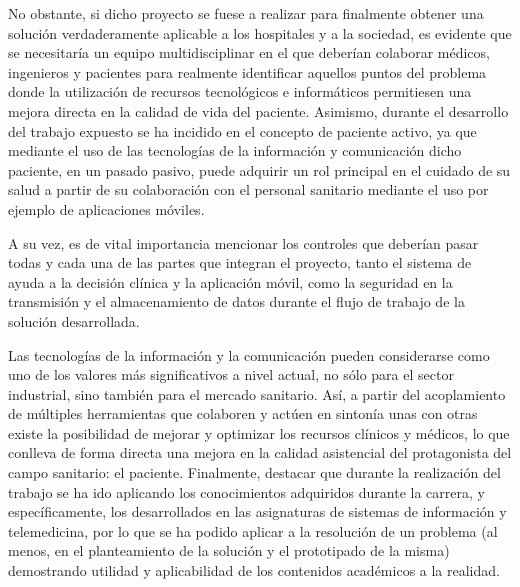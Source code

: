 \documentclass{article}
\begin{document}
No obstante, si dicho proyecto se fuese  a  realizar  para  finalmente
obtener una solución verdaderamente aplicable a los hospitales y a  la
sociedad, es evidente que se necesitaría un equipo multidisciplinar en
el  que  deberían  colaborar  médicos,	ingenieros  y  pacientes  para
realmente  identificar	aquellos  puntos   del	 problema   donde   la
utilización de recursos tecnológicos e	informáticos  permitiesen  una
mejora directa en la calidad de vida del paciente.  Asimismo,  durante
el desarrollo del trabajo expuesto se ha incidido en  el  concepto  de
paciente activo, ya que mediante el  uso  de  las  tecnologías	de  la
información y comunicación dicho paciente, en un pasado pasivo,  puede
adquirir un rol principal en el cuidado de su salud  a	partir	de  su
colaboración con el personal sanitario mediante el uso por ejemplo  de
aplicaciones móviles.

A su vez, es de vital importancia mencionar los controles que deberían
pasar todas y cada una de las partes que integran el  proyecto,  tanto
el sistema de ayuda a la decisión clínica y la aplicación móvil,  como
la seguridad en la transmisión y el almacenamiento de datos durante el
flujo de trabajo de la solución desarrollada.

Las  tecnologías  de  la  información	y   la	 comunicación	pueden
considerarse como uno  de  los	valores  más  significativos  a  nivel
actual, no sólo para  el  sector  industrial,  sino  también  para  el
mercado sanitario.   Así,  a  partir  del  acoplamiento  de  múltiples
herramientas que colaboren y actúen en sintonía unas con otras	existe
la posibilidad de mejorar y optimizar los recursos clínicos y médicos,
lo que conlleva de forma directa una mejora en la calidad  asistencial
del  protagonista  del	campo  sanitario:  el  paciente.   Finalmente,
destacar que durante la realización del trabajo se  ha	ido  aplicando
los conocimientos adquiridos durante la  carrera,  y  específicamente,
los desarrollados en las asignaturas  de  sistemas  de	información  y
telemedicina, por lo que se ha podido aplicar a la  resolución	de  un
problema  (al  menos,  en  el  planteamiento  de  la  solución	y   el
prototipado de la misma) demostrando utilidad y aplicabilidad  de  los
contenidos académicos a la realidad.
\end{document}
